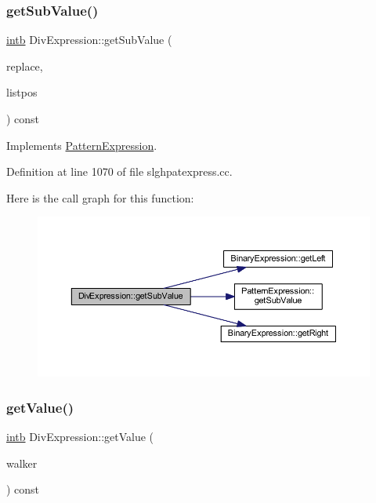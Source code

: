 \subsubsection{\texorpdfstring{getSubValue()}{getSubValue()}}
{\footnotesize\ttfamily \mbox{\hyperlink{types_8h_aa925ba3e627c2df89d5b1cfe84fb8572}{intb}} Div\+Expression\+::get\+Sub\+Value (\begin{DoxyParamCaption}\item[{const vector$<$ \mbox{\hyperlink{types_8h_aa925ba3e627c2df89d5b1cfe84fb8572}{intb}} $>$ \&}]{replace,  }\item[{int4 \&}]{listpos }\end{DoxyParamCaption}) const\hspace{0.3cm}{\ttfamily [virtual]}}



Implements \mbox{\hyperlink{class_pattern_expression_ade37db4aa76dd442b189bf4a6bb2d9dd}{Pattern\+Expression}}.



Definition at line 1070 of file slghpatexpress.\+cc.

Here is the call graph for this function\+:
\nopagebreak
\begin{figure}[H]
\begin{center}
\leavevmode
\includegraphics[width=350pt]{class_div_expression_ae6015a985bb843e4de0debf6387d1259_cgraph}
\end{center}
\end{figure}
\mbox{\label{class_div_expression_ab7f9f33b65f50d8b246ab69694cbf150}} 
\subsubsection{\texorpdfstring{getValue()}{getValue()}}
{\footnotesize\ttfamily \mbox{\hyperlink{types_8h_aa925ba3e627c2df89d5b1cfe84fb8572}{intb}} Div\+Expression\+::get\+Value (\begin{DoxyParamCaption}\item[{\mbox{\hyperlink{class_parser_walker}{Parser\+Walker}} \&}]{walker }\end{DoxyParamCaption}) const\hspace{0.3cm}{\ttfamily [virtual]}}



